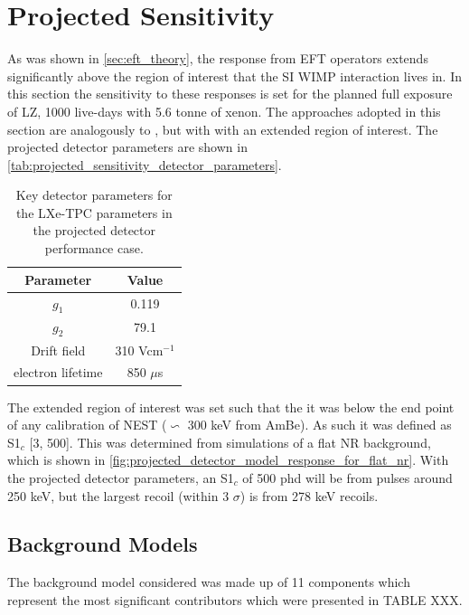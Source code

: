 \section{Projected Sensitivity}
\par
As was shown in \autoref{sec:eft_theory}, the response from EFT operators extends significantly above the region of interest that the SI WIMP interaction lives in.
In this section the sensitivity to these responses is set for the planned full exposure of LZ, 1000 live-days with 5.6 tonne of xenon.
The approaches adopted in this section are analogously to \cite{LZ_projected_sensitivity_paper_ref}, but with with an extended region of interest.
The projected detector parameters are shown in \autoref{tab:projected_sensitivity_detector_parameters}.
\begin{table}[]
    \centering
    \begin{tabular}{c|c}
        Parameter   & Value  \\ \hline
        $g_{1}$     & 0.119 \\
        $g_{2}$     & 79.1  \\
        Drift field & 310 Vcm$^{-1}$ \\
        electron lifetime & 850 $\mu$s
    \end{tabular}
    \caption{Key detector parameters for the LXe-TPC parameters in the projected detector performance case.}
    \label{tab:projected_sensitivity_detector_parameters}
\end{table}
\par
The extended region of interest was set such that the it was below the end point of any calibration of NEST ($\backsim$ 300 keV from AmBe).
As such it was defined as S1$_c$ [3, 500].
This was determined from simulations of a flat NR background, which is shown in \autoref{fig:projected_detector_model_response_for_flat_nr}.
With the projected detector parameters, an S1$_c$ of 500 phd will be from pulses around 250 keV, but the largest recoil (within 3 $\sigma$) is from 278 keV recoils.



\subsection{Background Models}
\par
The background model considered was made up of 11 components which represent the most significant contributors which were presented in TABLE XXX.


